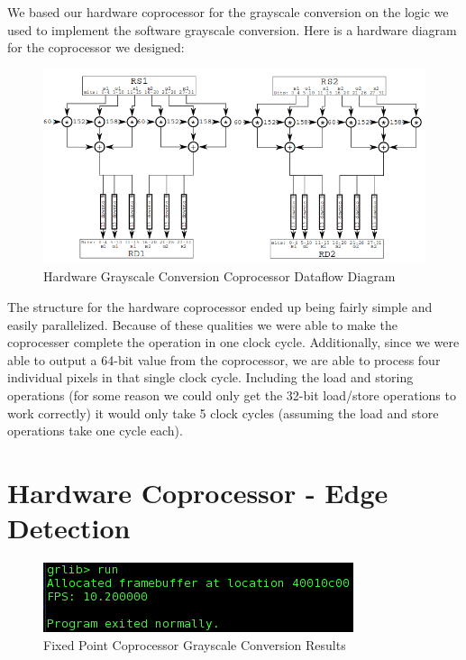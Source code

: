 \documentclass{article}
\begin{document}
We based our hardware coprocessor for the grayscale conversion on the logic we used to implement the software grayscale conversion. Here is a hardware diagram for the coprocessor we designed:

	 \begin{figure}[H]
	 	\begin{center}
	 		\includegraphics[scale=0.6]{../part5_files/Grayscale_coprocessor_dataflow.png}
	 		\caption{Hardware Grayscale Conversion Coprocessor Dataflow Diagram}
	 	\end{center}
	 \end{figure}

The structure for the hardware coprocessor ended up being fairly simple and easily parallelized. Because of these qualities we were able to make the coprocesser complete the operation in one clock cycle. Additionally, since we were able to output a 64-bit value from the coprocessor, we are able to process four individual pixels in that single clock cycle. Including the load and storing operations (for some reason we could only get the 32-bit load/store operations to work correctly) it would only take 5 clock cycles (assuming the load and store operations take one cycle each).

\section{Hardware Coprocessor - Edge Detection}

	 \begin{figure}[H]
	 	\begin{center}
	 		\includegraphics[scale=0.6]{../part5_files/Fixed_point_greyscale_coprocessor_results.png}
	 		\caption{Fixed Point Coprocessor Grayscale Conversion Results}
	 	\end{center}
	 \end{figure}
\end{document}
